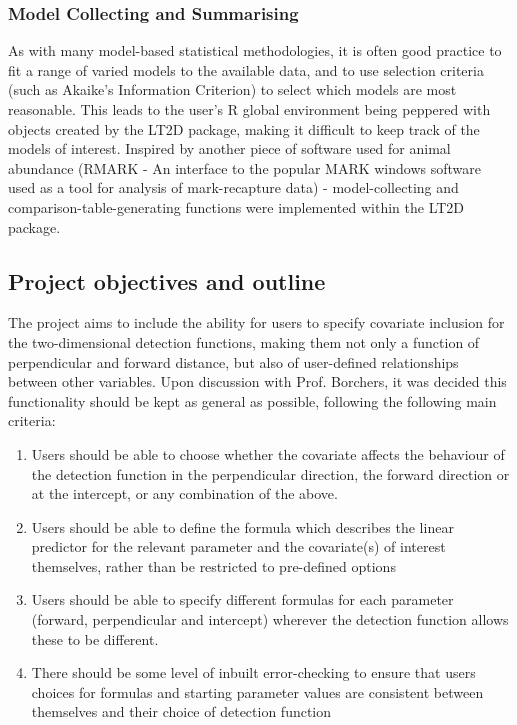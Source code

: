 \documentclass[11pt]{article}
\begin{document}
\begin{multicols}{2}
\subsubsection{Model Collecting and Summarising}
As with many model-based statistical methodologies, it is often good practice to fit a range of varied models to the available data, and to use selection criteria (such as Akaike's Information Criterion) to select which models are most reasonable. This leads to the user's R global environment being peppered with objects created by the LT2D package, making it difficult to keep track of the models of interest. Inspired by another piece of software used for animal abundance (RMARK - An interface to the popular MARK windows software used as a tool for analysis of mark-recapture data) - model-collecting and comparison-table-generating functions were implemented within the LT2D package.

\subsection{Project objectives and outline}
The project aims to include the ability for users to specify covariate inclusion for the two-dimensional detection functions, making them not only a function of perpendicular and forward distance, but also of user-defined relationships between other variables. Upon discussion with Prof. Borchers, it was decided this functionality should be kept as general as possible, following the following main criteria:

\begin{enumerate}
\item Users should be able to choose whether the covariate affects the behaviour of the detection function in the perpendicular direction, the forward direction or at the intercept, or any combination of the above.
\item Users should be able to define the formula which describes the linear predictor for the relevant parameter and the covariate(s) of interest themselves, rather than be restricted to pre-defined options
\item Users should be able to specify different formulas for each parameter (forward, perpendicular and intercept) wherever the detection function allows these to be different.
\item There should be some level of inbuilt error-checking to ensure that users choices for formulas and starting parameter values are consistent between themselves and their choice of detection function
\end{enumerate}


\end{multicols}
\end{document}
